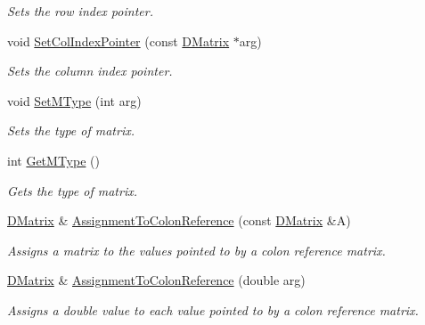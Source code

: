 \begin{DoxyCompactItemize}
\begin{DoxyCompactList}\small\item\em Sets the row index pointer. \item\end{DoxyCompactList}\item 
void \hyperlink{classDMatrix_a877dbfd1042abd3391f77a4aaf90c296}{SetColIndexPointer} (const \hyperlink{classDMatrix}{DMatrix} $\ast$arg)
\begin{DoxyCompactList}\small\item\em Sets the column index pointer. \item\end{DoxyCompactList}\item 
void \hyperlink{classDMatrix_aeb006280bc37e1d13ecf16164fff0f5c}{SetMType} (int arg)
\begin{DoxyCompactList}\small\item\em Sets the type of matrix. \item\end{DoxyCompactList}\item 
int \hyperlink{classDMatrix_a8617eafafa13e38ba6dd7d0265b1c9a3}{GetMType} ()
\begin{DoxyCompactList}\small\item\em Gets the type of matrix. \item\end{DoxyCompactList}\item 
\hyperlink{classDMatrix}{DMatrix} \& \hyperlink{classDMatrix_a9630eee5b92eb0b651789204f91b55e7}{AssignmentToColonReference} (const \hyperlink{classDMatrix}{DMatrix} \&A)
\begin{DoxyCompactList}\small\item\em Assigns a matrix to the values pointed to by a colon reference matrix. \item\end{DoxyCompactList}\item 
\hyperlink{classDMatrix}{DMatrix} \& \hyperlink{classDMatrix_ac4080d0de15b606eac2a3e0ab34a8e13}{AssignmentToColonReference} (double arg)
\begin{DoxyCompactList}\small\item\em Assigns a double value to each value pointed to by a colon reference matrix. \item\end{DoxyCompactList}\end{DoxyCompactItemize}
